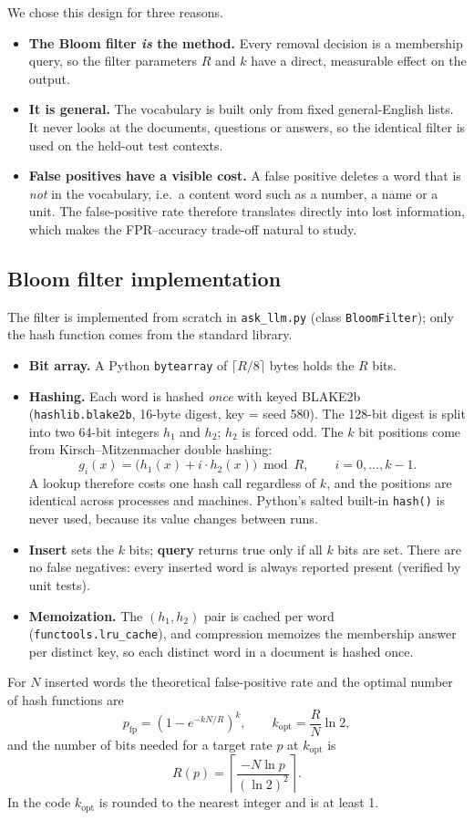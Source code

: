 \documentclass[11pt]{article}
\newcommand{\code}[1]{\texttt{#1}}
\newcommand{\pfp}{p_{\mathrm{fp}}}
\begin{document}
We chose this design for three reasons.
\begin{itemize}
  \item \textbf{The Bloom filter \emph{is} the method.} Every removal decision is a membership
        query, so the filter parameters $R$ and $k$ have a direct, measurable effect on the output.
  \item \textbf{It is general.} The vocabulary is built only from fixed general-English lists. It
        never looks at the documents, questions or answers, so the identical filter is used on the
        held-out test contexts.
  \item \textbf{False positives have a visible cost.} A false positive deletes a word that is
        \emph{not} in the vocabulary, i.e.\ a content word such as a number, a name or a unit. The
        false-positive rate therefore translates directly into lost information, which makes the
        FPR--accuracy trade-off natural to study.
\end{itemize}

\subsection{Bloom filter implementation}
The filter is implemented from scratch in \code{ask\_llm.py} (class \code{BloomFilter}); only the
hash function comes from the standard library.
\begin{itemize}
  \item \textbf{Bit array.} A Python \code{bytearray} of $\lceil R/8\rceil$ bytes holds the $R$ bits.
  \item \textbf{Hashing.} Each word is hashed \emph{once} with keyed BLAKE2b
        (\code{hashlib.blake2b}, 16-byte digest, key = seed 580). The 128-bit digest is split into two
        64-bit integers $h_1$ and $h_2$; $h_2$ is forced odd. The $k$ bit positions come from
        Kirsch--Mitzenmacher double hashing:
        \[ g_i(x) = \bigl(h_1(x) + i\cdot h_2(x)\bigr) \bmod R, \qquad i = 0,\dots,k-1. \]
        A lookup therefore costs one hash call regardless of $k$, and the positions are identical
        across processes and machines. Python's salted built-in \code{hash()} is never used, because
        its value changes between runs.
  \item \textbf{Insert} sets the $k$ bits; \textbf{query} returns true only if all $k$ bits are set.
        There are no false negatives: every inserted word is always reported present (verified by
        unit tests).
  \item \textbf{Memoization.} The $(h_1,h_2)$ pair is cached per word (\code{functools.lru\_cache}),
        and compression memoizes the membership answer per distinct key, so each distinct word in a
        document is hashed once.
\end{itemize}
For $N$ inserted words the theoretical false-positive rate and the optimal number of hash functions
are
\[
  \pfp = \left(1 - e^{-kN/R}\right)^{k}, \qquad k_{\mathrm{opt}} = \frac{R}{N}\ln 2,
\]
and the number of bits needed for a target rate $p$ at $k_{\mathrm{opt}}$ is
\[
  R(p) = \left\lceil \frac{-N \ln p}{(\ln 2)^2} \right\rceil .
\]
In the code $k_{\mathrm{opt}}$ is rounded to the nearest integer and is at least 1.
\end{document}
